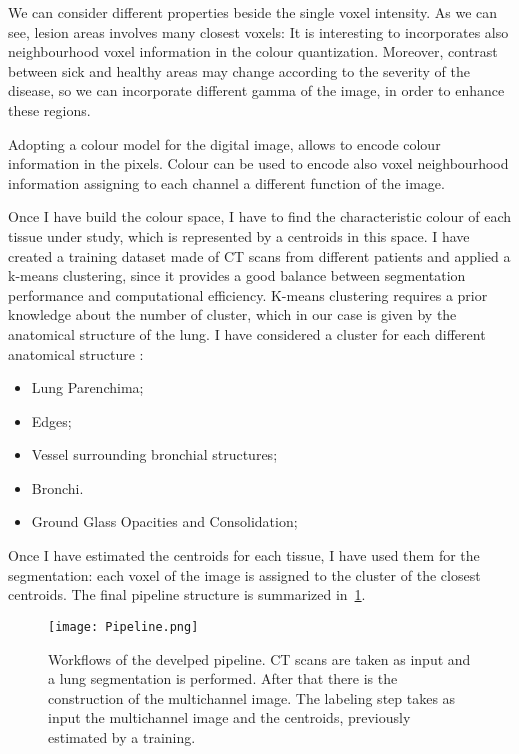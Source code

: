 \documentclass{standalone}
\begin{document}
	We can consider different properties beside the single voxel intensity. As we can see, lesion areas involves many closest voxels: It is interesting to incorporates also neighbourhood voxel information in the colour quantization. Moreover, contrast between sick and healthy areas may change according to the severity of the disease, so we can incorporate different gamma of the image, in order to enhance these regions.
	
	Adopting a colour model for the digital image, allows to encode colour information in the pixels. Colour can be used to encode also voxel neighbourhood information assigning to each channel a different function of the image.
	
	Once I have build the colour space, I have to find the characteristic colour of each tissue under study, which is represented by a centroids in this space. I have created a training dataset made of CT scans from different patients and applied a  k-means clustering, since it provides a good balance between segmentation performance and computational efficiency. K-means clustering requires a prior knowledge about the number of cluster, which in our case is given by the anatomical structure of the lung. I have considered a cluster for each different anatomical structure : 
		\begin{itemize}
		\item Lung Parenchima; 
		
		\item  Edges;
		
		\item Vessel surrounding bronchial structures;
		
		\item Bronchi.
		
		\item  Ground Glass Opacities and Consolidation;
		
	\end{itemize}
		
	Once I have estimated the centroids for each tissue, I have used them for the  segmentation: each voxel of the image  is assigned  to the cluster of the closest centroids. The final pipeline structure is summarized in \figurename\,\ref{fig:Pipeline}.
	
	\begin{figure}[h!]
		\centering
		\texttt{[image: Pipeline.png]}
		\caption{Workflows of the develped pipeline. CT scans are taken as input and a lung segmentation is performed. After that there is the construction of the multichannel image. The labeling step takes as input the multichannel image and the centroids, previously estimated by a training.}\label{fig:Pipeline}
	\end{figure}
\end{document}
